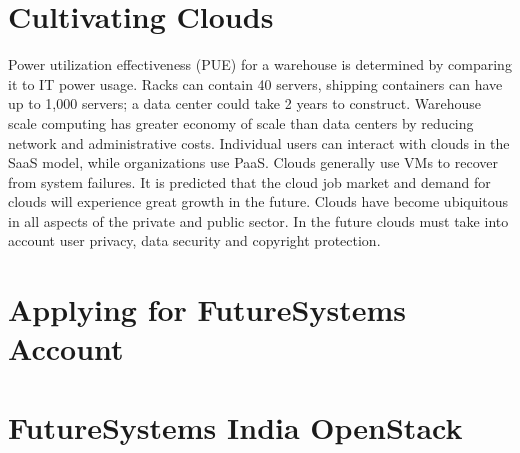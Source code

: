 
\section{Cultivating Clouds}

Power utilization effectiveness (PUE) for a warehouse is determined by
comparing it to IT power usage. Racks can contain 40 servers, shipping
containers can have up to 1,000 servers; a data center could take 2
years to construct. Warehouse scale computing has greater economy of
scale than data centers by reducing network and administrative costs.
Individual users can interact with clouds in the SaaS model, while
organizations use PaaS. Clouds generally use VMs to recover from system
failures. It is predicted that the cloud job market and demand for
clouds will experience great growth in the future. Clouds have become
ubiquitous in all aspects of the private and public sector. In the
future clouds must take into account user privacy, data security and
copyright protection.


\section{Applying for FutureSystems Account}



\section{FutureSystems India OpenStack}



